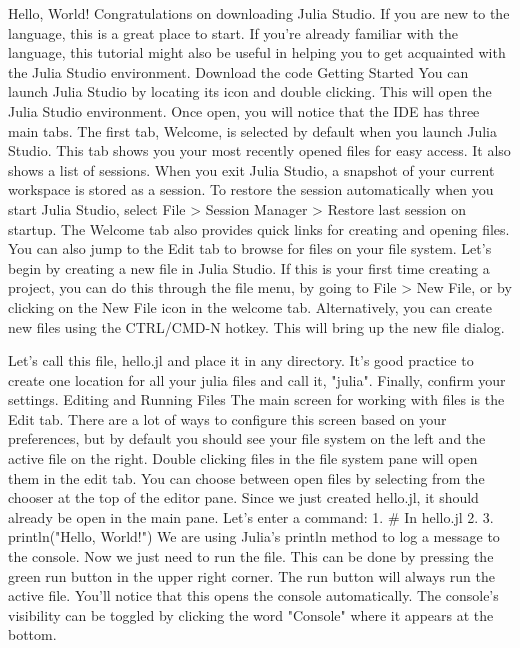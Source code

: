 Hello, World!
Congratulations on downloading Julia Studio. If you are new to the language, this is a great place to start. If you're already familiar with the language, this tutorial might also be useful in helping you to get acquainted with the Julia Studio environment.
 Download the code
Getting Started
You can launch Julia Studio by locating its icon and double clicking. This will open the Julia Studio environment. Once open, you will notice that the IDE has three main tabs.
The first tab, Welcome, is selected by default when you launch Julia Studio. This tab shows you your most recently opened files for easy access. It also shows a list of sessions. When you exit Julia Studio, a snapshot of your current workspace is stored as a session. To restore the session automatically when you start Julia Studio, select File > Session Manager > Restore last session on startup.
The Welcome tab also provides quick links for creating and opening files. You can also jump to the Edit tab to browse for files on your file system.
Let's begin by creating a new file in Julia Studio. If this is your first time creating a project, you can do this through the file menu, by going to File > New File, or by clicking on the New File icon in the welcome tab. Alternatively, you can create new files using the CTRL/CMD-N hotkey.
This will bring up the new file dialog.
 
Let's call this file, hello.jl and place it in any directory. It's good practice to create one location for all your julia files and call it, "julia". Finally, confirm your settings.
Editing and Running Files
The main screen for working with files is the Edit tab. There are a lot of ways to configure this screen based on your preferences, but by default you should see your file system on the left and the active file on the right. Double clicking files in the file system pane will open them in the edit tab. You can choose between open files by selecting from the chooser at the top of the editor pane. Since we just created hello.jl, it should already be open in the main pane.
Let's enter a command:
1.	# In hello.jl
2.	 
3.	println("Hello, World!")
We are using Julia's println method to log a message to the console. Now we just need to run the file. This can be done by pressing the green run button in the upper right corner. The run button will always run the active file.
You'll notice that this opens the console automatically. The console's visibility can be toggled by clicking the word "Console" where it appears at the bottom.
 
